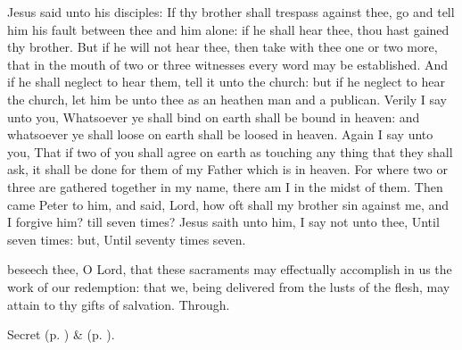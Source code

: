 
\vspace{-0.5\baselineskip}


\vspace{-0.25\baselineskip}

 Jesus said unto his disciples: If thy brother shall trespass against thee, go and tell him his fault between thee and him alone: if he shall hear thee, thou hast gained thy brother. But if he will not hear thee, then take with thee one or two more, that in the mouth of two or three witnesses every word may be established. And if he shall neglect to hear them, tell it unto the church: but if he neglect to hear the church, let him be unto thee as an heathen man and a publican. Verily I say unto you, Whatsoever ye shall bind on earth shall be bound in heaven: and whatsoever ye shall loose on earth shall be loosed in heaven. Again I say unto you, That if two of you shall agree on earth as touching any thing that they shall ask, it shall be done for them of my Father which is in heaven. For where two or three are gathered together in my name, there am I in the midst of them. Then came Peter to him, and said, Lord, how oft shall my brother sin against me, and I forgive him? till seven times? Jesus saith unto him, I say not unto thee, Until seven times: but, Until seventy times seven.


\secret
{} beseech thee, O Lord, that these sacraments may effectually accomplish in us the work of our redemption: that we, being delivered from the lusts of the flesh, may attain to thy gifts of salvation. Through.
\begin{rubric}
     Secret  (p. \pageref{AshWednesdayMassSecret}) \&   (p. \pageref{SPLivingDeparted}).
\end{rubric}


